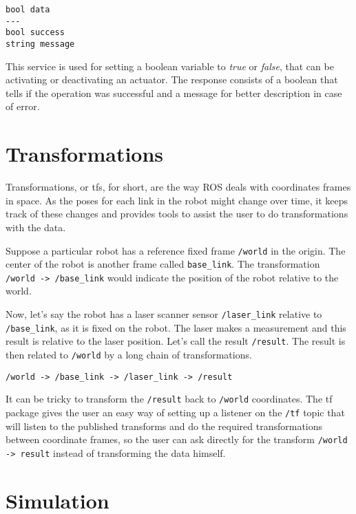 \begin{lstlisting}
bool data
---
bool success
string message
\end{lstlisting}

This service is used for setting a boolean variable to \textit{true} or \textit{false}, that can be activating or deactivating an actuator. The response consists of a boolean that tells if the operation was successful and a message for better description in case of error.

\section{Transformations}

Transformations, or tfs, for short, are the way ROS deals with coordinates frames in space. As the poses for each link in the robot might change over time, it keeps track of these changes and provides tools to assist the user to do transformations with the data.

Suppose a particular robot has a reference fixed frame \texttt{/world} in the origin. The center of the robot is another frame called \texttt{base\_link}. The transformation \texttt{/world -> /base\_link} would indicate the position of the robot relative to the world.

Now, let's say the robot has a laser scanner sensor \texttt{/laser\_link} relative to \texttt{/base\_link}, as it is fixed on the robot. The laser makes a measurement and this result is relative to the laser position. Let's call the result \texttt{/result}. The result is then related to \texttt{/world} by a long chain of transformations.

\begin{verbatim}
/world -> /base_link -> /laser_link -> /result
\end{verbatim}

It can be tricky to transform the \texttt{/result} back to \texttt{/world} coordinates. The tf package gives the user an easy way of setting up a listener on the \texttt{/tf} topic that will listen to the published transforms and do the required transformations between coordinate frames, so the user can ask directly for the transform \texttt{/world -> result} instead of transforming the data himself.

\section{Simulation}

